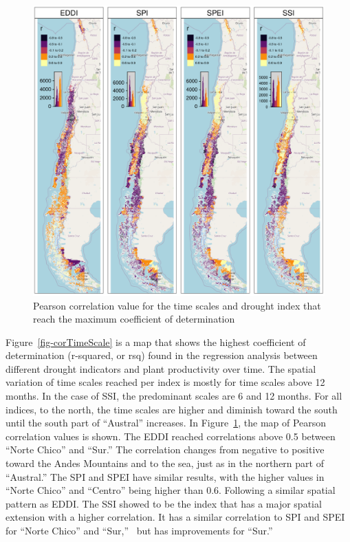 \documentclass[
  authoryear,
  preprint,
  3p,
  onecolumn]{elsarticle}
\begin{document}
\begin{figure}[!ht]

{\centering \includegraphics{../output/figs/mapa_cor_r_indices_zcNDVI6.png}

}

\caption{\label{fig-corPerson}Pearson correlation value for the time
scales and drought index that reach the maximum coefficient of
determination}

\end{figure}

Figure~\ref{fig-corTimeScale} is a map that shows the highest
coefficient of determination (r-squared, or rsq) found in the regression
analysis between different drought indicators and plant productivity
over time. The spatial variation of time scales reached per index is
mostly for time scales above 12 months. In the case of SSI, the
predominant scales are 6 and 12 months. For all indices, to the north,
the time scales are higher and diminish toward the south until the south
part of ``Austral'' increases. In Figure~\ref{fig-corPerson}, the map of
Pearson correlation values is shown. The EDDI reached correlations above
0.5 between ``Norte Chico'' and ``Sur.'' The correlation changes from
negative to positive toward the Andes Mountains and to the sea, just as
in the northern part of ``Austral.'' The SPI and SPEI have similar
results, with the higher values in ``Norte Chico'' and ``Centro'' being
higher than 0.6. Following a similar spatial pattern as EDDI. The SSI
showed to be the index that has a major spatial extension with a higher
correlation. It has a similar correlation to SPI and SPEI for ``Norte
Chico'' and ``Sur,''~ but has improvements for ``Sur.''
\end{document}
